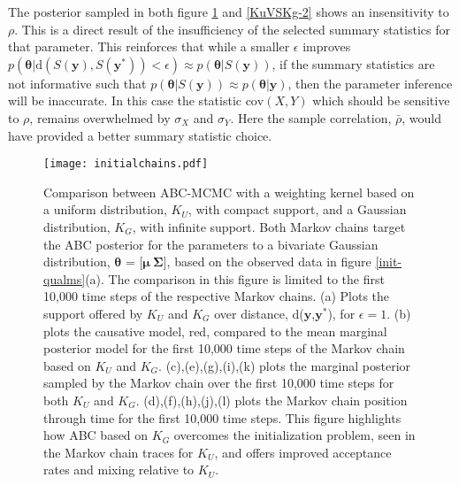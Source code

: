 The posterior sampled in both figure \ref{KuVSKg-1} and \ref{KuVSKg-2} shows an insensitivity to $\rho$. This is a direct result of the insufficiency of the selected summary statistics for that parameter. This reinforces that while a smaller $\epsilon$ improves $p(\bm{\theta}|\text{d}(S(\bm{y}),S(\bm{y^*}))<\epsilon) \approx p(\bm{\theta}|S(\bm{y}))$, if the summary statistics are not informative such that $p(\bm{\theta}|S(\bm{y})) \approx p(\bm{\theta}|\bm{y})$, then the parameter inference will be inaccurate. In this case the statistic $\text{cov}(X,Y)$ which should be sensitive to $\rho$, remains overwhelmed by $\sigma_X$ and $\sigma_Y$. Here the sample correlation, $\bar{\rho}$, would have provided a better summary statistic choice. 

\begin{figure}[H]
	\centering
	\texttt{[image: initialchains.pdf]}
	\caption{Comparison between ABC-MCMC with a weighting kernel based on a uniform distribution, $K_U$, with compact support, and a Gaussian distribution, $K_G$, with infinite support. Both Markov chains target the ABC posterior for the parameters to a bivariate Gaussian distribution, $\bm{\theta}$ = [$\bm{\mu}\ \bm{\Sigma}$], based on the observed data in figure \ref{init-qualms}(a). The comparison in this figure is limited to the first 10,000 time steps of the respective Markov chains. (a) Plots the support offered by $K_U$ and $K_G$ over distance, d($\bm{y}$,$\bm{y^*}$), for $\epsilon=1$. (b) plots the causative model, red, compared to the mean marginal posterior model for the first 10,000 time steps of the Markov chain based on $K_U$ and $K_G$. (c),(e),(g),(i),(k) plots the marginal posterior sampled by the Markov chain over the first 10,000 time steps for both $K_U$ and $K_G$. (d),(f),(h),(j),(l) plots the Markov chain position through time for the first 10,000 time steps. This figure highlights how ABC based on $K_G$ overcomes the initialization problem, seen in the Markov chain traces for $K_U$, and offers improved acceptance rates and mixing relative to $K_U$.}
	\label{KuVSKg-1}
\end{figure}

